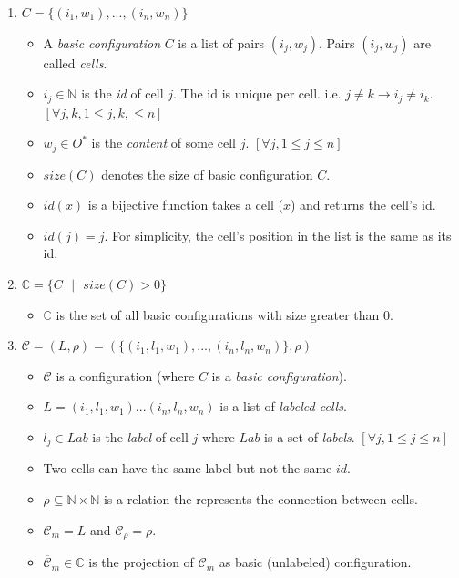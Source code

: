 \documentclass{article}
\newcommand{\s}{\text{ }}
\begin{document}
\begin{appendices}
\begin{enumerate} 

\item $C = \{(i_1,w_1),...,(i_n,w_n)\}$ 

      \begin{itemize}
      \item A \textit{basic configuration} $C$ is a list of pairs $(i_j,w_j)$. Pairs $(i_j,w_j)$ are called \textit{cells}.
      \item $i_j \in \mathbb{N}$ is the \textit{id} of cell $j$. The id is unique per cell. i.e. $j \neq k \rightarrow i_j \neq i_k$. $[\forall j,k, 1 \leq j,k, \leq n]$
      \item $w_j \in O^*$ is the \textit{content} of some cell $j$.  $[\forall j, 1 \leq j \leq n]$
      \item $size(C)$ denotes the size of basic configuration $C$.
      \item $id(x)$ is a bijective function takes a cell ($x$) and returns the cell's id. 
      \item $id(j) = j$. For simplicity, the cell's position in the list is the same as its id.
      \end{itemize}

   \item $\mathbb{C} = \{ C \s | \s size(C) > 0\}$
         \begin{itemize}
         \item $\mathbb{C}$ is the set of all basic configurations with size greater than 0.
         \end{itemize}

\item $\mathcal{C} = (L, \rho) = (\{(i_1,l_1,w_1),...,(i_n,l_n,w_n)\}, \rho)$

      \begin{itemize}
      \item $\mathcal{C}$ is a configuration (where $C$  is a \textit{basic configuration}).
      \item $L =(i_1,l_1,w_1)...(i_n,l_n,w_n)$ is a list of \textit{labeled cells}.
      \item $l_j \in Lab$ is the \textit{label} of cell $j$ where $Lab$ is a set of \textit{labels}. $[\forall j, 1 \leq j \leq n]$
      \item Two cells can have the same label but not the same $id$.
      \item $\rho \subseteq \mathbb{N} \times \mathbb{N}$ is a relation the represents the connection between cells.
      \item $\mathcal{C}_m = L$ and $\mathcal{C}_\rho = \rho$.
      \item $\overline{\mathcal{C}}_m \in \mathbb{C}$ is the projection of $\mathcal{C}_m$ as basic (unlabeled) configuration.
      \end{itemize}


\end{enumerate}
\end{appendices}
\end{document}
